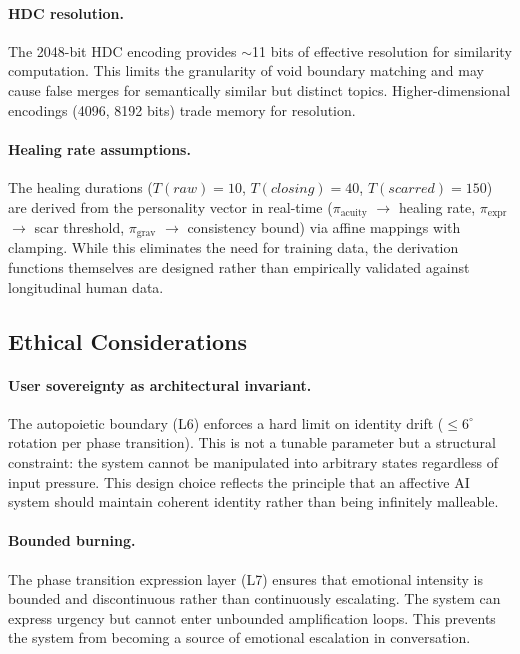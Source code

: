 \documentclass[11pt]{article}
\begin{document}
\paragraph{HDC resolution.} The 2048-bit HDC encoding provides $\sim$11 bits of effective resolution for similarity computation. This limits the granularity of void boundary matching and may cause false merges for semantically similar but distinct topics. Higher-dimensional encodings (4096, 8192 bits) trade memory for resolution.

\paragraph{Healing rate assumptions.} The healing durations ($T(raw)=10$, $T(closing)=40$, $T(scarred)=150$) are derived from the personality vector in real-time ($\pi_{\text{acuity}}$ $\to$ healing rate, $\pi_{\text{expr}}$ $\to$ scar threshold, $\pi_{\text{grav}}$ $\to$ consistency bound) via affine mappings with clamping. While this eliminates the need for training data, the derivation functions themselves are designed rather than empirically validated against longitudinal human data.

\subsection{Ethical Considerations}

\paragraph{User sovereignty as architectural invariant.} The autopoietic boundary (L6) enforces a hard limit on identity drift ($\leq 6^\circ$ rotation per phase transition). This is not a tunable parameter but a structural constraint: the system cannot be manipulated into arbitrary states regardless of input pressure. This design choice reflects the principle that an affective AI system should maintain coherent identity rather than being infinitely malleable.

\paragraph{Bounded burning.} The phase transition expression layer (L7) ensures that emotional intensity is bounded and discontinuous rather than continuously escalating. The system can express urgency but cannot enter unbounded amplification loops. This prevents the system from becoming a source of emotional escalation in conversation.
\end{document}
